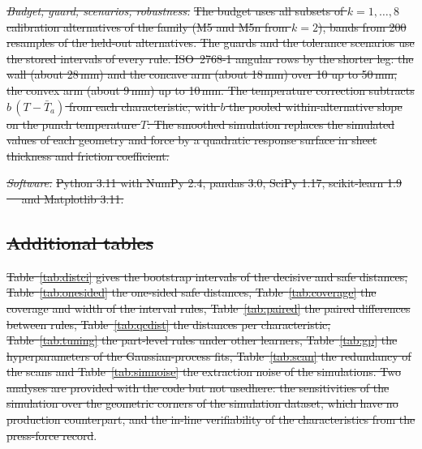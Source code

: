 \documentclass[pdflatex,sn-basic,lineno]{sn-jnl} %
\providecommand{\DIFadd}[1]{{\protect\color{blue}\uwave{#1}}} %
\providecommand{\DIFdel}[1]{{\protect\color{red}\sout{#1}}}                      %
\providecommand{\DIFaddbegin}{} %
\providecommand{\DIFaddend}{} %
\providecommand{\DIFdelend}{} %
\newcommand{\DIFaddincludegraphics}[2][]{{\color{blue}\fbox{\DIFOincludegraphics[#1]{#2}}}} %
\DeclareRobustCommand{\DIFaddbegin}{\DIFOaddbegin \let\includegraphics\DIFaddincludegraphics} %
\DeclareRobustCommand{\DIFaddend}{\DIFOaddend \let\includegraphics\DIFOincludegraphics} %
\DeclareRobustCommand{\DIFdelend}{\DIFOaddend \let\includegraphics\DIFOincludegraphics} %
\begin{document}
\emph{\DIFdel{Budget, guard, scenarios, robustness.}} %
\DIFdel{The budget uses all subsets of $k=1,\dots,8$ calibration alternatives of the family (M5 and M5n from $k=2$), bands from 200 resamples of the held-out alternatives. The guards and the tolerance scenarios use the stored intervals of every rule. ISO~2768-1 angular rows by the shorter leg: the wall (about 28\,mm) and the concave arm (about 18\,mm) over 10 up to 50\,mm, the convex arm (about 9\,mm) up to 10\,mm. The temperature correction subtracts $b\,(T-\bar T_a)$ from each characteristic, with $b$ the pooled within-alternative slope on the punch temperature $T$. The smoothed simulation replaces the simulated values of each geometry and force by a quadratic response surface in sheet thickness and friction coefficient.
}%

\emph{\DIFdel{Software.}} %
\DIFdel{Python 3.11 with NumPy 2.4, pandas 3.0, SciPy 1.17, scikit-learn 1.9 \mbox{%
\citep{pedregosa2011scikit} }\hskip0pt%
and Matplotlib 3.11.
}%

\subsection{\DIFdel{Additional tables}}%
\addtocounter{subsection}{-1}%

\DIFdel{Table~\ref{tab:distci} gives the bootstrap intervals of the decisive and safe distances, Table~\ref{tab:onesided} the one-sided safe distances, Table~\ref{tab:coverage} the coverage and width of the interval rules, Table~\ref{tab:paired} the paired differences between rules, Table~\ref{tab:qcdist} the distances per characteristic, Table~\ref{tab:tuning} the part-level rules under other learners, Table~\ref{tab:gp} the hyperparameters of the Gaussian-process fits, Table~\ref{tab:scan} the redundancy of the scans and Table~\ref{tab:simnoise} the extraction noise of the simulations. Two analyses are provided with the code but not usedhere: the sensitivities of the simulation over the geometric corners of the simulation dataset, which have no production counterpart, and the in-line verifiability of the characteristics from the press-force record}\DIFdelend \DIFaddbegin \DIFadd{no AI-generated images are used}\DIFaddend .
\end{document}
